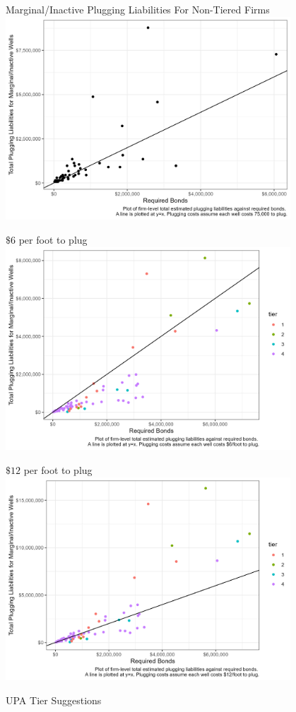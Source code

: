 \documentclass{beamer}
\begin{document}
\begin{frame}{Marginal/Inactive Plugging Liabilities For Non-Tiered Firms}
\label{Tier4Liability2}
\vspace{-0.3cm}
    \includegraphics[width=0.8\textwidth]{Figures/InactiveMarginalLiabilities2_Tier4SmallFirms.jpg}

    \hyperlink{Fig2Marginal}{}
\end{frame}

\begin{frame}{$\$6$ per foot to plug}
    \includegraphics[width=0.8\textwidth]{Figures/InactiveMarginalLiabilities3.jpg}
\end{frame}

\begin{frame}{$\$12$ per foot to plug}
    \includegraphics[width=0.8\textwidth]{Figures/InactiveMarginalLiabilities4.jpg}
\end{frame}

\begin{frame}{UPA Tier Suggestions}
\label{UPA}
    
\end{frame}
\end{document}
